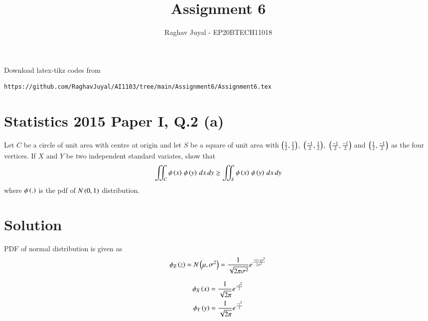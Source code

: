 \documentclass[journal,12pt,twocolumn]{IEEEtran}
\begin{document}
\let\vec\mathbf
\renewcommand{\thefigure}{\theproblem}
\def\putbox#1#2#3{\makebox[0in][l]{\makebox[#1][l]{}\raisebox{\baselineskip}[0in][0in]{\raisebox{#2}[0in][0in]{#3}}}}
     \def\rightbox#1{\makebox[0in][r]{#1}}
     \def\centbox#1{\makebox[0in]{#1}}
     \def\topbox#1{\raisebox{-\baselineskip}[0in][0in]{#1}}
     \def\midbox#1{\raisebox{-0.5\baselineskip}[0in][0in]{#1}}
\vspace{3cm}
\title{Assignment 6}
\author{Raghav Juyal - EP20BTECH11018}
\maketitle
\newpage
\bigskip
\renewcommand{\thefigure}{\theenumi}
\renewcommand{\thetable}{\theenumi}
Download latex-tikz codes from 
%
\begin{lstlisting}
https://github.com/RaghavJuyal/AI1103/tree/main/Assignment6/Assignment6.tex
\end{lstlisting}
\section*{Statistics 2015 Paper I, Q.2 (a)}
Let $C$ be a circle of unit area with centre at origin and let $S$ be a square of unit area with $\left(\frac{1}{2},\frac{1}{2}\right)$, $\,\left(\frac{-1}{2},\frac{1}{2}\right)$, $\,\left(\frac{-1}{2},\frac{-1}{2}\right)$ and $\,\left(\frac{1}{2},\frac{-1}{2}\right)$ as the four vertices. If $X$ and $Y$ be two independent standard variates, show that
\begin{align*}
    \iint_C{\phi\left(x\right)\,\phi\left(y\right)\,dx\,dy} \geq \iint_S{\phi\left(x\right)\,\phi\left(y\right)\,dx\,dy}
\end{align*}
where $\phi\left(.\right)$ is the pdf of $N\left(0,1\right)$ distribution.
\section*{Solution}
\begin{definition}
PDF of normal distribution is given as
\begin{align}
    \phi_Z\left(z\right) = N\left(\mu,\sigma^2\right) = \frac{1}{\sqrt{2\pi\sigma^2}}e^\frac{-\left(z-\mu\right)^2}{2\sigma^2}
\end{align}
\end{definition}

\begin{corollary}
\begin{align}
    \phi_X\left(x\right) = \frac{1}{\sqrt{2\pi}}e^\frac{-x^2}{2}\label{eq1}\\
    \phi_Y\left(y\right) = \frac{1}{\sqrt{2\pi}}e^\frac{-y^2}{2}\label{eq2}
\end{align}
\end{corollary}
\end{document}
